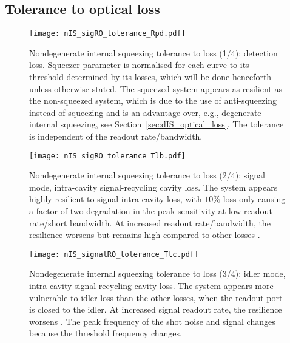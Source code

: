 \subsection{Tolerance to optical loss}
\begin{figure}
	\centering
	\texttt{[image: nIS\_sigRO\_tolerance\_Rpd.pdf]}
	\caption{  Nondegenerate internal squeezing tolerance to loss (1/4): detection loss. Squeezer parameter is normalised for each curve to its threshold determined by its losses, which will be done henceforth unless otherwise stated. The squeezed system appears as resilient as the non-squeezed system, which is due to the use of anti-squeezing instead of squeezing and is an advantage over, e.g., degenerate internal squeezing, see Section~\ref{sec:dIS_optical_loss}. The tolerance is independent of the readout rate/bandwidth.}
	\label{fig:nIS_sigRO_tolerance_Rpd}
\end{figure}
\begin{figure}
	\centering
	\texttt{[image: nIS\_sigRO\_tolerance\_Tlb.pdf]}
	\caption{  Nondegenerate internal squeezing tolerance to loss (2/4): signal mode, intra-cavity signal-recycling cavity loss. The system appears highly resilient to signal intra-cavity loss, with $10\%$ loss only causing a factor of two degradation in the peak sensitivity at low readout rate/short bandwidth. At increased readout rate/bandwidth, the resilience worsens but remains high compared to other losses .}
	\label{fig:nIS_sigRO_tolerance_Tlb}
\end{figure}
\begin{figure}
	\centering
	\texttt{[image: nIS\_signalRO\_tolerance\_Tlc.pdf]}
	\caption{ Nondegenerate internal squeezing tolerance to loss (3/4): idler mode, intra-cavity signal-recycling cavity loss. The system appears more vulnerable to idler loss than the other losses, when the readout port is closed to the idler. At increased signal readout rate, the resilience worsens . The peak frequency of the shot noise and signal changes because the threshold frequency changes.}
	\label{fig:nIS_sigRO_tolerance_Tlc}
\end{figure}
